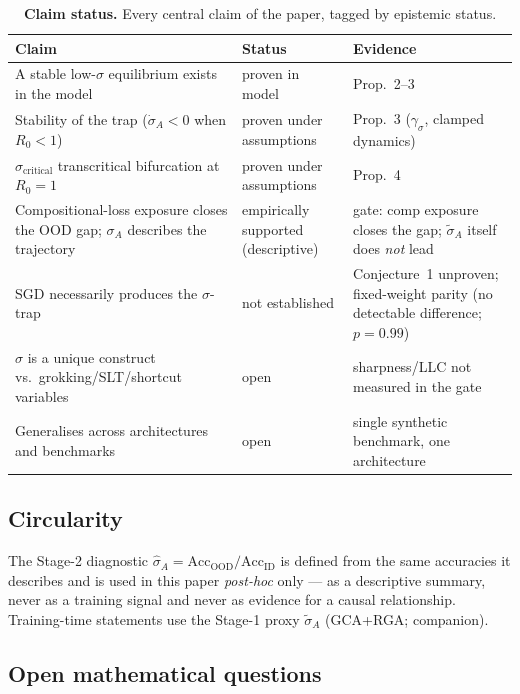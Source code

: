 \documentclass{article}
\theoremstyle{definition}
\begin{document}
\begin{table}[htbp]
\centering
\small
\caption{\textbf{Claim status.} Every central claim of the paper,
tagged by epistemic status.}\label{tab:claim-status}
\begin{tabular}{p{6.2cm} p{3.6cm} p{4.6cm}}
\toprule
\textbf{Claim} & \textbf{Status} & \textbf{Evidence} \\
\midrule
A stable low-$\sigma$ equilibrium exists in the model & proven in model & Prop.~2--3 \\
Stability of the trap ($\dot{\sigma}_A < 0$ when $R_0 < 1$) & proven under assumptions & Prop.~3 ($\gamma_\sigma$, clamped dynamics) \\
$\sigma_{\text{critical}}$ transcritical bifurcation at $R_0 = 1$ & proven under assumptions & Prop.~4 \\
Compositional-loss exposure closes the OOD gap; $\sigma_A$ describes the trajectory & empirically supported (descriptive) & gate: comp exposure closes the gap; $\tilde{\sigma}_A$ itself does \emph{not} lead \\
SGD necessarily produces the $\sigma$-trap & not established & Conjecture~1 unproven; fixed-weight parity (no detectable difference; $p = 0.99$) \\
$\sigma$ is a unique construct vs.\ grokking/SLT/shortcut variables & open & sharpness/LLC not measured in the gate \\
Generalises across architectures and benchmarks & open & single synthetic benchmark, one architecture \\
\bottomrule
\end{tabular}
\end{table}

\subsection{Circularity}

The Stage-2 diagnostic $\hat{\sigma}_A = \text{Acc}_{\text{OOD}} /
\text{Acc}_{\text{ID}}$ is defined from the same accuracies it
describes and is used in this paper \emph{post-hoc} only --- as a
descriptive summary, never as a training signal and never as evidence
for a causal relationship. Training-time statements use the Stage-1
proxy $\tilde{\sigma}_A$ (GCA+RGA; companion).

\subsection{Open mathematical questions}
\end{document}
